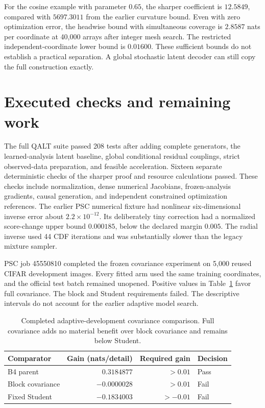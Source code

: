 \documentclass[11pt]{article}
\begin{document}
For the cosine example with parameter $0.65$, the sharper coefficient is $12.5849$, compared with $5697.3011$ from the earlier curvature bound. Even with zero optimization error, the headwise bound with simultaneous coverage is $2.8587$ nats per coordinate at 40,000 arrays after integer mesh search. The restricted independent-coordinate lower bound is $0.01600$. These sufficient bounds do not establish a practical separation. A global stochastic latent decoder can still copy the full construction exactly.

\section{Executed checks and remaining work}
The full QALT suite passed 208 tests after adding complete generators, the learned-analysis latent baseline, global conditional residual couplings, strict observed-data preparation, and feasible acceleration. Sixteen separate deterministic checks of the sharper proof and resource calculations passed. These checks include normalization, dense numerical Jacobians, frozen-analysis gradients, causal generation, and independent constrained optimization references. The earlier PSC numerical fixture had nonlinear six-dimensional inverse error about $2.2\times10^{-12}$. Its deliberately tiny correction had a normalized score-change upper bound $0.000185$, below the declared margin $0.005$. The radial inverse used 44 CDF iterations and was substantially slower than the legacy mixture sampler.

PSC job 45550810 completed the frozen covariance experiment on 5,000 reused CIFAR development images. Every fitted arm used the same training coordinates, and the official test batch remained unopened. Positive values in Table~\ref{tab:covariance} favor full covariance. The block and Student requirements failed. The descriptive intervals do not account for the earlier adaptive model search.

\clearpage
\begin{table}[ht]
\centering
\small
\begin{tabular}{lrrl}
\toprule
Comparator & Gain (nats/detail) & Required gain & Decision\\
\midrule
B4 parent & $0.3184877$ & $>0.01$ & Pass\\
Block covariance & $-0.0000028$ & $>0.01$ & Fail\\
Fixed Student & $-0.1834003$ & $>-0.01$ & Fail\\
\bottomrule
\end{tabular}
\caption{Completed adaptive-development covariance comparison. Full covariance adds no material benefit over block covariance and remains below Student.}
\label{tab:covariance}
\end{table}
\end{document}
